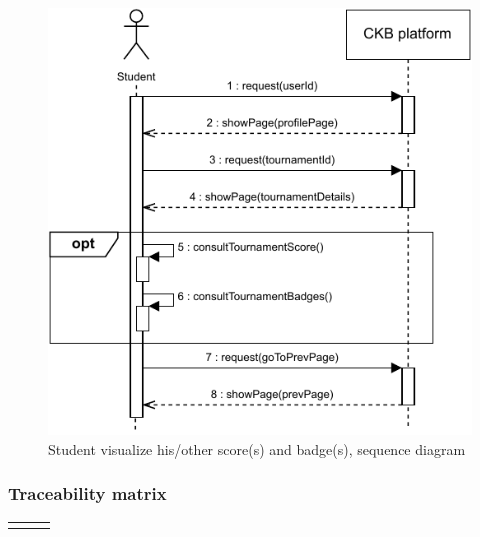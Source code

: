 \documentclass{article}
\begin{document}
{\begin{enumerate}
          \begin{figure}[H]
              \centering
              \includegraphics[scale=0.95]{images/SequenceDiagrams/Sequence13.pdf}
              \caption{Student visualize his/other score(s) and badge(s), sequence diagram}
              \label{fig:ScoresBadgesVisualizationSeqDiagram}
          \end{figure}
\end{enumerate}
\subsubsection{Traceability matrix}
\begin{xltabular}{\textwidth}
    {| >{\raggedright\arraybackslash}g | >{\raggedright\arraybackslash}X | >{\raggedright\arraybackslash}X |}
    \hline
    \endfirsthead
    \hline
    \endhead
    \endfoot
    \hline
    \endlastfoot


\end{xltabular}}
\end{document}
